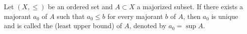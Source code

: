 Let $(X, \leq)$ be an ordered set and $A \subset X$ a majorized subset. If there exists a majorant $a_0$ of $A$ such that $a_0 \leq b$ for every majorant $b$ of $A$, then $a_0$ is unique and is called the  (least upper bound) of $A$, denoted by $a_0 = \sup A$.
